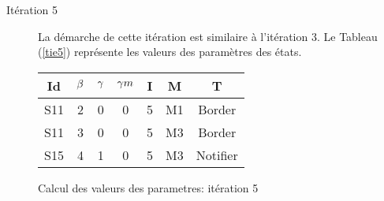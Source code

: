 \begin{Exemple}
\begin{description}
\item[Itération 5] La démarche de cette itération est similaire à l'itération 3. Le Tableau (\ref{tie5}) représente les valeurs des paramètres  des états.
\begin{tableth}
	\centering
	\begin{tabular}{|*{7}{c|}}
		\hline
		Id&$\beta{}$&	$\gamma{}$	&$\gamma m{}$ &	I&	M&	T\\ \hline
		S11&	2&	0&	0&	5&	M1&	Border\\ \hline
		S11&	3&	0&	0&	5&	M3&	Border\\ \hline
		S15&	4&	1&	0&	5&	M3&	Notifier\\ \hline
	\end{tabular}
	\caption{Calcul des valeurs des parametres: itération 5}\label{tie5}
\end{tableth}

\end{description}	
\end{Exemple}